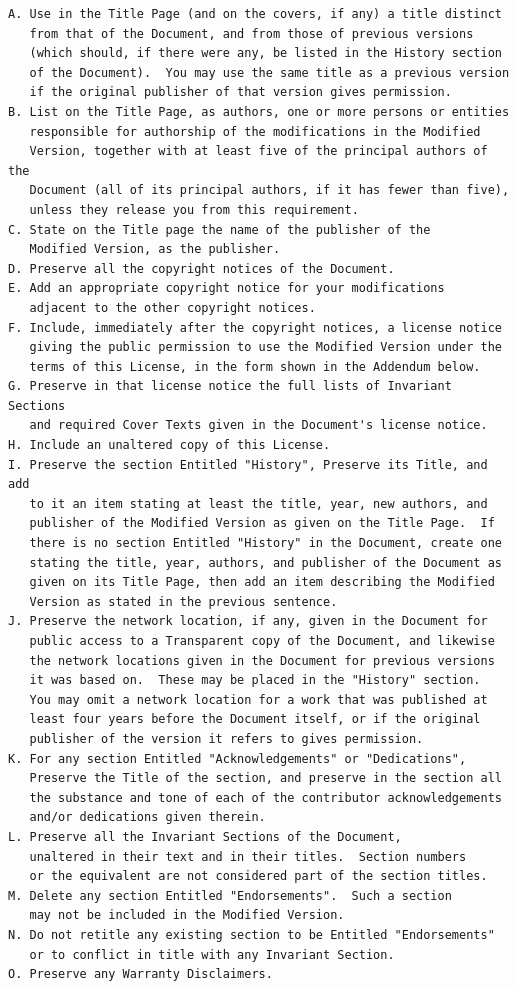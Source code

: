 \documentclass[a4paper]{report}
\begin{document}
\begin{verbatim}
A. Use in the Title Page (and on the covers, if any) a title distinct
   from that of the Document, and from those of previous versions
   (which should, if there were any, be listed in the History section
   of the Document).  You may use the same title as a previous version
   if the original publisher of that version gives permission.
B. List on the Title Page, as authors, one or more persons or entities
   responsible for authorship of the modifications in the Modified
   Version, together with at least five of the principal authors of the
   Document (all of its principal authors, if it has fewer than five),
   unless they release you from this requirement.
C. State on the Title page the name of the publisher of the
   Modified Version, as the publisher.
D. Preserve all the copyright notices of the Document.
E. Add an appropriate copyright notice for your modifications
   adjacent to the other copyright notices.
F. Include, immediately after the copyright notices, a license notice
   giving the public permission to use the Modified Version under the
   terms of this License, in the form shown in the Addendum below.
G. Preserve in that license notice the full lists of Invariant Sections
   and required Cover Texts given in the Document's license notice.
H. Include an unaltered copy of this License.
I. Preserve the section Entitled "History", Preserve its Title, and add
   to it an item stating at least the title, year, new authors, and
   publisher of the Modified Version as given on the Title Page.  If
   there is no section Entitled "History" in the Document, create one
   stating the title, year, authors, and publisher of the Document as
   given on its Title Page, then add an item describing the Modified
   Version as stated in the previous sentence.
J. Preserve the network location, if any, given in the Document for
   public access to a Transparent copy of the Document, and likewise
   the network locations given in the Document for previous versions
   it was based on.  These may be placed in the "History" section.
   You may omit a network location for a work that was published at
   least four years before the Document itself, or if the original
   publisher of the version it refers to gives permission.
K. For any section Entitled "Acknowledgements" or "Dedications",
   Preserve the Title of the section, and preserve in the section all
   the substance and tone of each of the contributor acknowledgements
   and/or dedications given therein.
L. Preserve all the Invariant Sections of the Document,
   unaltered in their text and in their titles.  Section numbers
   or the equivalent are not considered part of the section titles.
M. Delete any section Entitled "Endorsements".  Such a section
   may not be included in the Modified Version.
N. Do not retitle any existing section to be Entitled "Endorsements"
   or to conflict in title with any Invariant Section.
O. Preserve any Warranty Disclaimers.


\end{verbatim}
\end{document}
